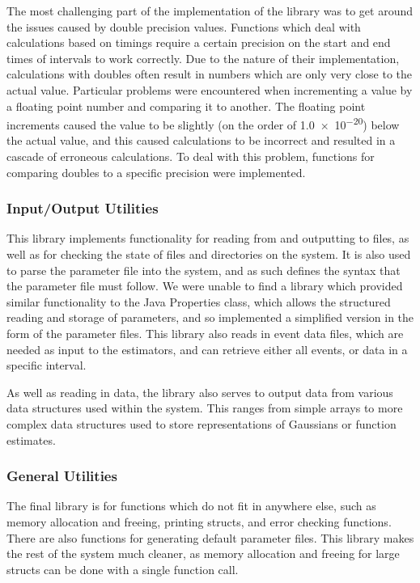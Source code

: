 \documentclass[a4paper,11pt]{article}
\begin{document}
    The most challenging part of the implementation of the library was to get
    around the issues caused by double precision values. Functions which deal
    with calculations based on timings require a certain precision on the start
    and end times of intervals to work correctly. Due to the nature of their
    implementation, calculations with doubles often result in numbers which are
    only very close to the actual value. Particular problems were encountered
    when incrementing a value by a floating point number and comparing it to
    another. The floating point increments caused the value to be slightly (on
    the order of \num{1.0e-20}) below the actual value, and this caused
    calculations to be incorrect and resulted in a cascade of erroneous
    calculations. To deal with this problem, functions for comparing doubles to
    a specific precision were implemented.
\subsubsection{Input/Output Utilities}
\label{sec-6-3-3}

    This library implements functionality for reading from and outputting to
    files, as well as for checking the state of files and directories on the
    system. It is also used to parse the parameter file into the system, and as
    such defines the syntax that the parameter file must follow. We were unable
    to find a library which provided similar functionality to the Java
    Properties class, which allows the structured reading and storage of
    parameters, and so implemented a simplified version in the form of the
    parameter files. This library also reads in event data files, which are
    needed as input to the estimators, and can retrieve either all events, or
    data in a specific interval.

    As well as reading in data, the library also serves to output data from
    various data structures used within the system. This ranges from simple
    arrays to more complex data structures used to store representations of
    Gaussians or function estimates.
\subsubsection{General Utilities}
\label{sec-6-3-4}

    The final library is for functions which do not fit in anywhere else, such
    as memory allocation and freeing, printing structs, and error checking
    functions. There are also functions for generating default parameter
    files. This library makes the rest of the system much cleaner, as memory
    allocation and freeing for large structs can be done with a single function
    call. 
\end{document}

